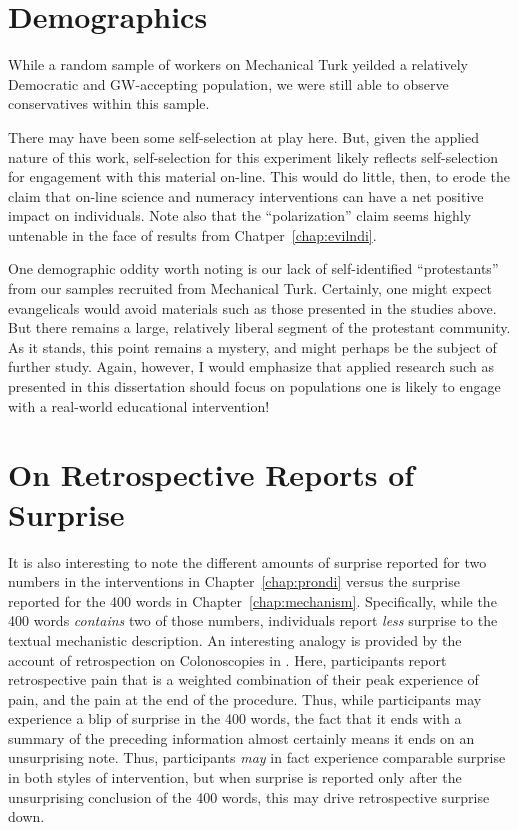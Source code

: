 \section{Demographics}

While a random sample of workers on Mechanical Turk yeilded a relatively
Democratic and GW-accepting population, we were still able to observe
conservatives within this sample.

There may have been some self-selection at play here. But, given the applied
nature of this work, self-selection for this experiment likely reflects
self-selection for engagement with this material on-line. This would do little,
then, to erode the claim that on-line science and numeracy interventions can
have a net positive impact on individuals. Note also that the “polarization”
claim seems highly untenable in the face of results from
Chatper~\ref{chap:evilndi}.

One demographic oddity worth noting is our lack of self-identified “protestants”
from our samples recruited from Mechanical Turk. Certainly, one might expect
evangelicals would avoid materials such as those presented in the studies above.
But there remains a large, relatively liberal segment of the protestant
community. As it stands, this point remains a mystery, and might perhaps be the
subject of further study. Again, however, I would emphasize that applied
research such as presented in this dissertation should focus on populations one
is likely to engage with a real-world educational intervention!

\section{On Retrospective Reports of Surprise}

It is also interesting to note the different amounts of surprise reported for
two numbers in the interventions in Chapter~\ref{chap:prondi} versus the
surprise reported for the 400 words in Chapter~\ref{chap:mechanism}.
Specifically, while the 400 words \emph{contains} two of those numbers,
individuals report \emph{less} surprise to the textual mechanistic description.
An interesting analogy is provided by the account of retrospection on
Colonoscopies in \textcite{kahneman_perspective_2003}. Here, participants report
retrospective pain that is a weighted combination of their peak experience of
pain, and the pain at the end of the procedure. Thus, while participants may
experience a blip of surprise in the 400 words, the fact that it ends with a
summary of the preceding information almost certainly means it ends on an
unsurprising note.  Thus, participants \emph{may} in fact experience comparable surprise
in both styles of intervention, but when surprise is reported only after the
unsurprising conclusion of the 400 words, this may drive retrospective surprise
down.


